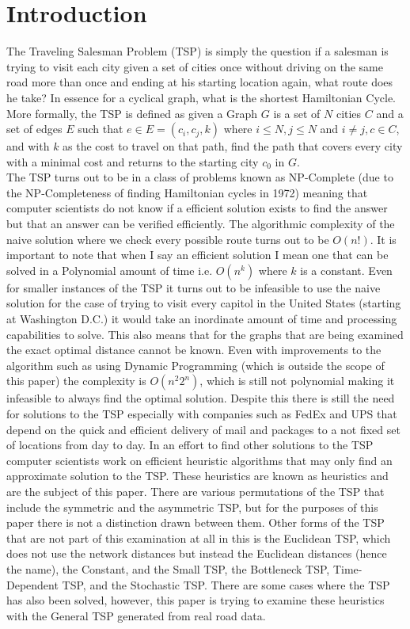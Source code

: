 \documentclass[midd]{thesis}
\newcommand{\tab}{\hspace*{2em}}
\begin{document}
\chapter{Introduction}
\tab The Traveling Salesman Problem (TSP) is simply the question if a salesman is trying to visit each city given a set of cities once without driving on the same road more than once and ending at his starting location again, what route does he take? In essence for a cyclical graph, what is the shortest Hamiltonian Cycle. More formally, the TSP is defined as given a Graph $G$ is a set of $N$ cities $C$ and a set of edges $E$ such that $e \in E = (c_{i}, c_{j},k)$ where $i \le N, j \le N$ and $i \ne j, c \in C$, and with $k$ as the cost to travel on that path, find the path that covers every city with a minimal cost and returns to the starting city $c_{0}$ in $G$. \\
\tab The TSP turns out to be in a class of problems known as NP-Complete\cite{cai} (due to the NP-Completeness of finding Hamiltonian cycles in 1972\cite{karp}) meaning that computer scientists do not know if a efficient solution exists to find the answer but that an answer can be verified efficiently. The algorithmic complexity of the naive solution where we check every possible route turns out to be $O(n!)$. It is important to note that when I say an efficient solution I mean one that can be solved in a Polynomial amount of time i.e. $O(n^k)$ where $k$ is a constant. Even for smaller instances of the TSP it turns out to be infeasible to use the naive solution for the case of trying to visit every capitol in the United States (starting at Washington D.C.) it would take an inordinate amount of time and processing capabilities to solve. This also means that for the graphs that are being examined the exact optimal distance cannot be known. Even with improvements to the algorithm such as using Dynamic Programming (which is outside the scope of this paper) the complexity is $O(n^{2}2^{n})$\cite{dyn}, which is still not polynomial making it  infeasible to always find the optimal solution. Despite this there is still the need for solutions to the TSP especially with companies such as FedEx and UPS that depend on the quick and efficient delivery of mail and packages to a not fixed set of locations from day to day. In an effort to find other solutions to the TSP computer scientists work on efficient heuristic algorithms that may only find an approximate solution to the TSP. These heuristics are known as heuristics and are the subject of this paper. There are various permutations of the TSP that include the symmetric and the asymmetric TSP, but for the purposes of this paper there is not a distinction drawn between them. Other forms of the TSP that are not part of this examination at all in this is the Euclidean TSP, which does not use the network distances but instead the Euclidean distances (hence the name), the Constant, and the Small TSP, the Bottleneck TSP, Time-Dependent TSP, and the Stochastic TSP. There are some cases where the TSP has also been solved, however, this paper is trying to examine these heuristics with the General TSP generated from real road data.\\
\end{document}
